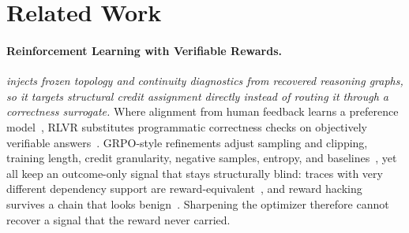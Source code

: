 \section{Related Work}
\label{sec:related_work}

\paragraph{Reinforcement Learning with Verifiable Rewards.}
\textit{\method injects frozen topology and continuity diagnostics from recovered reasoning graphs, so it targets structural credit assignment directly instead of routing it through a correctness surrogate.} Where alignment from human feedback learns a preference model~\citep{ouyang2022training}, RLVR substitutes programmatic correctness checks on objectively verifiable answers~\citep{shao2024deepseekmath,deepseekr1,lambert2024tulu3,zeng2503simplerlzoo}. GRPO-style refinements adjust sampling and clipping, training length, credit granularity, negative samples, entropy, and baselines~\citep{yu2025dapo,liu2025prorl,kazemnejad2025vineppo,zhu2025negsample,cui2025entropy,ahmadian2024back,hu2025reinforce++}, yet all keep an outcome-only signal that stays structurally blind: traces with very different dependency support are reward-equivalent~\citep{chen2026does}, and reward hacking survives a chain that looks benign~\citep{gao2023scaling,skalse2022defining,wang2026trace}. Sharpening the optimizer therefore cannot recover a signal that the reward never carried.

